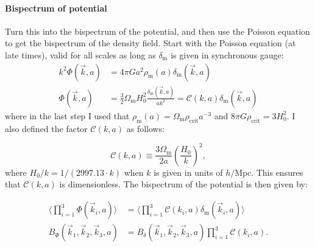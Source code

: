         \paragraph{Bispectrum of potential}
            Turn this into the bispectrum of the potential, and then use the Poisson equation to get the bispectrum of the density field. Start with the Poisson equation (at late times), valid for all scales as long as $\delta_\mathrm{m}$ is given in synchronous gauge:
            \begin{equation}
                \begin{split}
                    k^2\Phi(\vec{k},a) &= 4\pi G a^2 \rho_\mathrm{m}(a) \delta_\mathrm{m}(\vec{k},a)\\
                    \Phi(\vec{k}, a) &= \frac{3}{2}\Omega_\mathrm{m} H_0^2 \frac{\delta_\mathrm{m}(\vec{k},a)}{ak^2} = \mathcal{C}(k,a)\delta_\mathrm{m}(\vec{k},a)
                \end{split}
            \end{equation}
            where in the last step I used that $\rho_\mathrm{m}(a) = \Omega_\mathrm{m} \rho_\mathrm{crit} a^{-3}$ and $8\pi G \rho_\mathrm{crit} = 3H_0^2$. I also defined the factor $\mathcal{C}(k, a)$ as follows:
        
            \begin{equation}
                \mathcal{C}(k,a) \equiv \frac{3\Omega_\mathrm{m}}{2a}\left(\frac{H_0}{k}\right)^2,
            \end{equation}
            where $H_0/k=1/(2997.13\cdot k)$ when $k$ is given in units of $h/\mathrm{Mpc}$.  This ensures that $\mathcal{C}(k,a)$ is dimensionless. The bispectrum of the potential is then given by:

            \begin{equation}
                \begin{split}
                    \langle \prod_{i=1}^3\Phi(\vec{k}_i,a) \rangle &= \langle \prod_{i=1}^3\mathcal{C}(k_i,a)\delta_\mathrm{m}(\vec{k}_i,a) \rangle \\
                    B_\Phi(\vec{k}_1,\vec{k}_2,\vec{k}_3, a) &=  B_\delta(\vec{k}_1,\vec{k}_2,\vec{k}_3, a) \prod_{i=1}^3\mathcal{C}(k_i,a). 
                \end{split}
            \end{equation}

